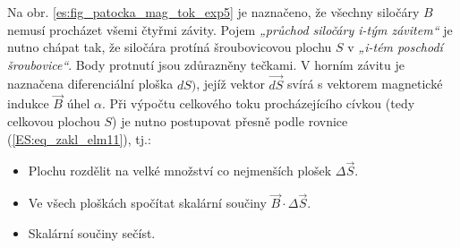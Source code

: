         Na obr. \ref{es:fig_patocka_mag_tok_exp5} je naznačeno, že všechny siločáry \(B\) nemusí 
        procházet všemi čtyřmi závity. Pojem \emph{„průchod siločáry i-tým závitem“} je nutno 
        chápat tak, že siločára protíná šroubovicovou plochu \(S\) v \emph{„i-tém poschodí 
        šroubovice“}. Body protnutí jsou zdůrazněny tečkami. V horním závitu je naznačena 
        diferenciální ploška \(dS)\), jejíž vektor \(\vec{dS}\) svírá s vektorem magnetické indukce 
        \(\vec{B}\) úhel \(\alpha\). Při výpočtu celkového toku procházejícího cívkou 
        (tedy celkovou plochou \(S\)) je nutno postupovat přesně podle rovnice 
        (\ref{ES:eq_zakl_elm11}), tj.:
        \begin{itemize}\addtolength{\itemsep}{-0.5\baselineskip}
          \item Plochu rozdělit na velké množství co nejmenších plošek \(\Delta\vec{S}\).
          \item Ve všech ploškách spočítat skalární součiny \(\vec{B}\cdot\Delta\vec{S}\).
          \item Skalární součiny sečíst.
        \end{itemize}
        

